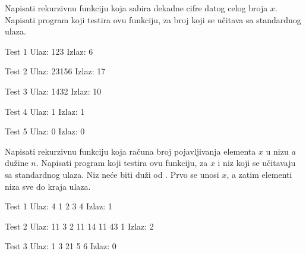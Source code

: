 \begin{Exercise}[label=111]
Napisati rekurzivnu funkciju koja sabira dekadne cifre datog
  celog broja $x$. Napisati program koji testira ovu funkciju, za broj
  koji se učitava sa standardnog ulaza.
  
\begin{minitest}
\begin{test}{Test 1}
Ulaz:    123  
Izlaz:   6 
\end{test}
\end{minitest}
\begin{minitest}
\begin{test}{Test 2}
Ulaz:    23156    
Izlaz:   17 
\end{test}
\end{minitest}
\begin{minitest}
\begin{test}{Test 3}
Ulaz:   1432
Izlaz:   10        
\end{test}
\end{minitest}

\begin{minitest}
\begin{test}{Test 4}
Ulaz:   1       
Izlaz:  1       
\end{test}
\end{minitest}
\begin{minitest}
\begin{test}{Test 5}
Ulaz:   0
Izlaz:  0
\end{test}
\end{minitest}
\end{Exercise}
\begin{Answer}[ref=111]
\end{Answer}


\begin{Exercise}[label=112]
Napisati rekurzivnu funkciju koja računa broj pojavljivanja
  elementa $x$ u nizu $a$ dužine $n$. Napisati program koji testira
  ovu funkciju, za $x$ i niz koji se učitavaju sa standardnog
  ulaza. Niz neće biti duži od . Prvo se unosi $x$, a zatim
  elementi niza sve do kraja ulaza.
  
\begin{minitest}
\begin{test}{Test 1}
Ulaz:    4 1 2 3 4     
Izlaz:   1              
\end{test}
\end{minitest}
\begin{miditest}
\begin{test}{Test 2}
Ulaz:   11 3 2 11 14 11 43 1      
Izlaz:   2                      
\end{test}
\end{miditest}

\begin{minitest}
\begin{test}{Test 3}
Ulaz:  1 3 21 5 6
Izlaz:  0    
\end{test}
\end{minitest}
\end{Exercise}
\begin{Answer}[ref=112]
\end{Answer}


